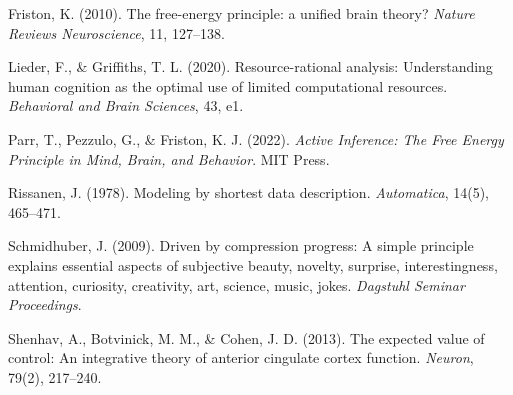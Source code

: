 \documentclass[11pt, a4paper]{article}
\begin{document}
Friston, K. (2010). The free-energy principle: a unified brain theory? \textit{Nature Reviews Neuroscience}, 11, 127--138.

Lieder, F., \& Griffiths, T. L. (2020). Resource-rational analysis: Understanding human cognition as the optimal use of limited computational resources. \textit{Behavioral and Brain Sciences}, 43, e1.

Parr, T., Pezzulo, G., \& Friston, K. J. (2022). \textit{Active Inference: The Free Energy Principle in Mind, Brain, and Behavior}. MIT Press.

Rissanen, J. (1978). Modeling by shortest data description. \textit{Automatica}, 14(5), 465--471.

Schmidhuber, J. (2009). Driven by compression progress: A simple principle explains essential aspects of subjective beauty, novelty, surprise, interestingness, attention, curiosity, creativity, art, science, music, jokes. \textit{Dagstuhl Seminar Proceedings}.

Shenhav, A., Botvinick, M. M., \& Cohen, J. D. (2013). The expected value of control: An integrative theory of anterior cingulate cortex function. \textit{Neuron}, 79(2), 217--240.
\end{document}
